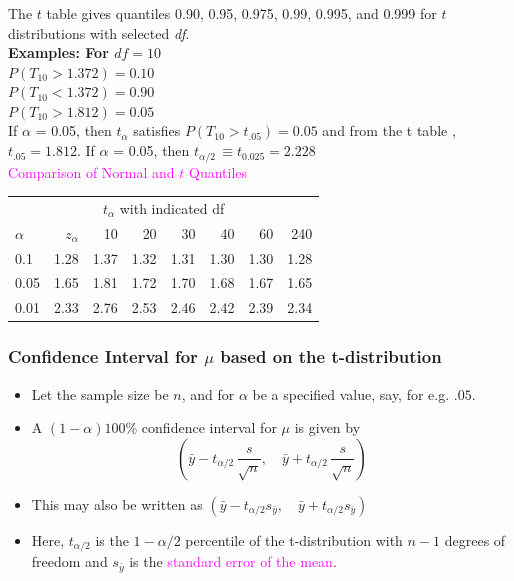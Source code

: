 \documentclass[xcolor=dvipsnames,12pt]{beamer}
\begin{document}
\begin{frame}
\frametitle{}
The $t$ table gives quantiles 0.90, 0.95, 0.975, 0.99,
0.995, and 0.999 for $t$ distributions with selected \textit{df}.\\[.1in]
\textbf{Examples:  For $df = 10$}\\
$P(T_{10} > 1.372) = 0.10$\\
 $P(T_{10} < 1.372) = 0.90$\\
 $P(T_{10} > 1.812) = 0.05$\\[.1in]
If $\alpha$ = 0.05, then $t_\alpha$ satisfies $P(T_{10} > t_{.05}) = 0.05$
and from the t table , $t_{.05} = 1.812$. If $\alpha$ = 0.05, then $t_{\alpha/2} \, \equiv t_{0.025}= 2.228 $\\[.1in]
\textcolor{magenta}{Comparison of Normal and $t$ Quantiles}
\begin{center}
\begin{tabular}{lrrrrrrr}
\multicolumn{8}{c}{$t_\alpha$ with indicated df} \\[.1in] 
$\alpha$ & $z_\alpha$ & 10 & 20 & 30 & 40 & 60 & 240 \\ \hline
0.1  & 1.28 & 1.37 & 1.32 & 1.31 & 1.30 & 1.30 & 1.28 \\
0.05 & 1.65 & 1.81 & 1.72 & 1.70 & 1.68 & 1.67 & 1.65 \\
0.01 & 2.33 & 2.76 & 2.53 & 2.46 & 2.42 & 2.39 & 2.34 \\ \hline
\end{tabular}
\end{center}
\end{frame}




\begin{frame}
\frametitle{Confidence Interval for $\mu$ based on the t-distribution}
\begin{itemize}
\item Let the sample size be  $n$, and for $\alpha$ be a specified value, say, for e.g. $.05$.
\item  A $(1-\alpha)100\%$ confidence interval for $\mu$ is given by   
       $$ \left(\bar{y} - t_{\alpha/2} \, \frac{s}{\sqrt{n}}, \quad
        \bar{y} + t_{\alpha/2} \, \frac{s}{\sqrt{n}}\right)$$
\item This may also be written as  $ \left(\bar{y} - t_{\alpha/2} s_{\bar{y}}, \quad \bar{y} +
         t_{\alpha/2} s_{\bar{y}} \right)$ 
\item Here, $t_{\alpha/2}$ is the $1-\alpha/2$ percentile of the t-distribution with
$n-1$ degrees of freedom and $s_{\bar{y}}$ is the \textcolor{magenta}{standard error of the mean}.
\end{itemize}
\end{frame}
\end{document}
